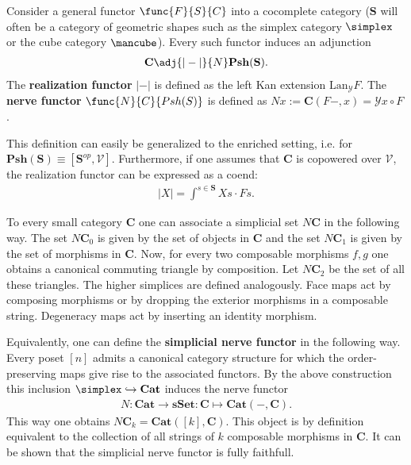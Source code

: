     \begin{construct}\label{model:nerve_and_realization}
        Consider a general functor $\func{F}{S}{C}$ into a cocomplete category ($\mathbf{S}$ will often be a category of geometric shapes such as the simplex category $\simplex$ or the cube category $\mbox{\mancube}$). Every such functor induces an adjunction
        \begin{gather}
            \mathbf{C}\adj{|-|}{N}\mathbf{Psh}(\mathbf{S}).
        \end{gather}
        The \textbf{realization functor} $|-|$ is defined as the left Kan extension $\mathrm{Lan}_{\mathcal{Y}}F$. The \textbf{nerve functor} $\func{N}{C}{Psh(S)}$ is defined as $Nx:=\mathbf{C}(F-,x)=\mathcal{Y}x\circ F$.

        This definition can easily be generalized to the enriched setting, i.e. for $\mathbf{Psh}(\mathbf{S})\equiv[\mathbf{S}^{op},\mathcal{V}]$. Furthermore, if one assumes that $\mathbf{C}$ is copowered over $\mathcal{V}$, the realization functor can be expressed as a coend:
        \begin{gather}
            |X| = \int^{s\in\mathbf{S}}Xs\cdot Fs.
        \end{gather}
    \end{construct}

    \begin{example}\label{model:nerve}
        To every small category \textbf{C} one can associate a simplicial set $N\mathbf{C}$ in the following way. The set $N\mathbf{C}_0$ is given by the set of objects in $\mathbf{C}$ and the set $N\mathbf{C}_1$ is given by the set of morphisms in $\mathbf{C}$. Now, for every two composable morphisms $f,g$ one obtains a canonical commuting triangle by composition. Let $N\mathbf{C}_2$ be the set of all these triangles. The higher simplices are defined analogously. Face maps act by composing morphisms or by dropping the exterior morphisms in a composable string. Degeneracy maps act by inserting an identity morphism.

        Equivalently, one can define the \textbf{simplicial nerve functor} in the following way. Every poset $[n]$ admits a canonical category structure for which the order-preserving maps give rise to the associated functors. By the above construction this inclusion $\simplex\hookrightarrow\mathbf{Cat}$ induces the nerve functor
        \begin{gather}
            N:\mathbf{Cat}\rightarrow\mathbf{sSet}:\mathbf{C}\mapsto\mathbf{Cat}(-,\mathbf{C}).
        \end{gather}
        This way one obtains $N\mathbf{C}_k=\mathbf{Cat}([k], \mathbf{C})$. This object is by definition equivalent to the collection of all strings of $k$ composable morphisms in $\mathbf{C}$. It can be shown that the simplicial nerve functor is fully faithfull.
    \end{example}

